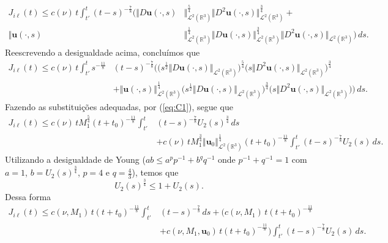 \documentclass[a4paper, 11pt]{book}
\theoremstyle{definition}
\newcommand{\bR}{\mathbb{R}}
\newcommand{\bu}{\mathbf{u}}
\newcommand{\cL}{\mathcal{L}}
\begin{document}
\begin{prf}
\[\begin{aligned}
            J_{i\ell}(t) \leqslant c(\nu) \, t \int_{t'}^t  (t - s)^{-\frac{7}{8}} \Big( \Vert D\bu(\cdot,s) &\Vert_{\cL^2(\bR^3)}^{\frac{5}{4}} \Vert D^2\bu(\cdot,s) \Vert_{\cL^2(\bR^3)}^{\frac{3}{4}} +\\ \Vert \bu(\cdot,s) &\Vert_{\cL^2(\bR^3)}^{\frac{1}{4}} \Vert D\bu(\cdot,s) \Vert_{\cL^2(\bR^3)}^{\frac{3}{4}} \Vert D^2\bu(\cdot,s) \Vert_{\cL^2(\bR^3)} \Big) \, ds.
        \end{aligned}
    \]
    Reescrevendo a desigualdade acima, concluímos que
    \[
        \begin{aligned}
            J_{i\ell}(t) \leqslant c(\nu) \, t \int_{t'}^t s^{-\frac{11}{8}} &(t - s)^{-\frac{7}{8}} \Big( \big(s^{\frac{1}{2}}\Vert D\bu(\cdot,s) \Vert_{\cL^2(\bR^3)} \big)^{\frac{5}{4}} \big( s\Vert D^2\bu(\cdot,s) \Vert_{\cL^2(\bR^3)}\big)^{\frac{3}{4}}\\ &+ \Vert \bu(\cdot,s) \Vert_{\cL^2(\bR^3)}^{\frac{1}{4}} \big( s^{\frac{1}{2}}\Vert D\bu(\cdot,s) \Vert_{\cL^2(\bR^3)}\big)^{\frac{3}{4}} \big(s\Vert D^2\bu(\cdot,s) \Vert_{\cL^2(\bR^3)}\big) \Big) \, ds.
        \end{aligned}
    \]
    Fazendo as substituições adequadas, por (\ref{eq:C1}), segue que
    \[
        \begin{aligned}
            J_{i\ell}(t) \leqslant c(\nu) \,t M_1^{\frac{5}{4}} (t + t_0)^{-\frac{11}{8}} \int_{t'}^t &(t - s)^{-\frac{7}{8}} U_2(s)^{\frac{3}{4}} \,ds\\ 
            &+ c(\nu) \, t M_1^{\frac{3}{4}} \Vert \bu_0 \Vert^{\frac{1}{4}}_{\cL^2(\bR^3)} (t + t_0)^{-\frac{11}{8}} \int_{t'}^{t} (t - s)^{-\frac{7}{8}} U_2(s) \,ds.
        \end{aligned}
    \]
    Utilizando a desigualdade de Young ($ab \leqslant a^pp^{-1} + b^q q^{-1}$ onde $p^{-1} + q^{-1} = 1$ com $a = 1$, $b = U_2(s)^{\frac{3}{4}}$, $p = 4$ e $q = \frac{4}{3}$), temos que
    \begin{equation} \label{eq:youngu2}
        U_2(s)^{\frac{3}{4}} \leqslant 1 + U_2(s).
    \end{equation}
    Dessa forma
    \[
        \begin{aligned}
            J_{i\ell}(t) \leqslant c(\nu, M_1) \,t (t + t_0)^{-\frac{11}{8}} \int_{t'}^t &(t - s)^{-\frac{7}{8}} \,ds + \Big( c(\nu, M_1) \,t (t + t_0)^{-\frac{11}{8}}\\ 
            &+ c(\nu, M_1, \bu_0) \, t (t + t_0)^{-\frac{11}{8}} \Big) \int_{t'}^t (t - s)^{-\frac{7}{8}} U_2(s) \,ds.
        \end{aligned}
\]
\end{prf}
\end{document}
